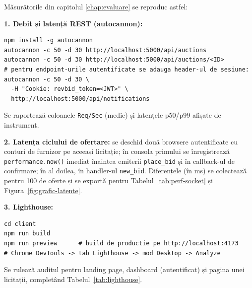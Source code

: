 \begin{appendices}
Măsurătorile din capitolul \ref{chap:evaluare} se reproduc astfel:

\textbf{1. Debit și latență REST (autocannon):}
\begin{verbatim}
npm install -g autocannon
autocannon -c 50 -d 30 http://localhost:5000/api/auctions
autocannon -c 50 -d 30 http://localhost:5000/api/auctions/<ID>
# pentru endpoint-urile autentificate se adauga header-ul de sesiune:
autocannon -c 50 -d 30 \
  -H "Cookie: revbid_token=<JWT>" \
  http://localhost:5000/api/notifications
\end{verbatim}
Se raportează coloanele \texttt{Req/Sec} (medie) și latențele p50/p99 afișate de instrument.

\textbf{2. Latența ciclului de ofertare:} se deschid două browsere autentificate cu conturi de furnizor pe aceeași licitație; în consola primului se înregistrează \texttt{performance.now()} imediat înaintea emiterii \texttt{place\_bid} și în callback-ul de confirmare; în al doilea, în handler-ul \texttt{new\_bid}. Diferențele (în ms) se colectează pentru 100 de oferte și se exportă pentru Tabelul~\ref{tab:perf-socket} și Figura~\ref{fig:grafic-latente}.

\textbf{3. Lighthouse:}
\begin{verbatim}
cd client
npm run build
npm run preview      # build de productie pe http://localhost:4173
# Chrome DevTools -> tab Lighthouse -> mod Desktop -> Analyze
\end{verbatim}
Se rulează auditul pentru landing page, dashboard (autentificat) și pagina unei licitații, completând Tabelul~\ref{tab:lighthouse}.

\end{appendices}

